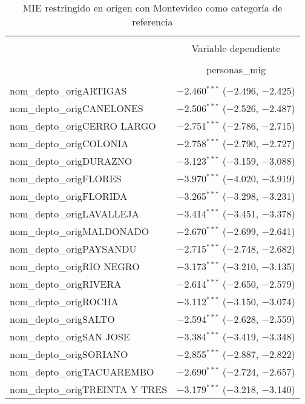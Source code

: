
\begin{table}[H] \centering 
  \caption{MIE restringido en origen con Montevideo como categoría de referencia} 
  \label{} 
\begin{tabular}{@{\extracolsep{5pt}}lc} 
\\[-1.8ex]\hline 
\hline \\[-1.8ex] 
 & \multicolumn{1}{c}{Variable dependiente} \\ 
\cline{2-2} 
\\[-1.8ex] & personas\_mig \\ 
\hline \\[-1.8ex] 
 nom\_depto\_origARTIGAS & $-$2.460$^{***}$ ($-$2.496, $-$2.425) \\ 
  nom\_depto\_origCANELONES & $-$2.506$^{***}$ ($-$2.526, $-$2.487) \\ 
  nom\_depto\_origCERRO LARGO & $-$2.751$^{***}$ ($-$2.786, $-$2.715) \\ 
  nom\_depto\_origCOLONIA & $-$2.758$^{***}$ ($-$2.790, $-$2.727) \\ 
  nom\_depto\_origDURAZNO & $-$3.123$^{***}$ ($-$3.159, $-$3.088) \\ 
  nom\_depto\_origFLORES & $-$3.970$^{***}$ ($-$4.020, $-$3.919) \\ 
  nom\_depto\_origFLORIDA & $-$3.265$^{***}$ ($-$3.298, $-$3.231) \\ 
  nom\_depto\_origLAVALLEJA & $-$3.414$^{***}$ ($-$3.451, $-$3.378) \\ 
  nom\_depto\_origMALDONADO & $-$2.670$^{***}$ ($-$2.699, $-$2.641) \\ 
  nom\_depto\_origPAYSANDU & $-$2.715$^{***}$ ($-$2.748, $-$2.682) \\ 
  nom\_depto\_origRIO NEGRO & $-$3.173$^{***}$ ($-$3.210, $-$3.135) \\ 
  nom\_depto\_origRIVERA & $-$2.614$^{***}$ ($-$2.650, $-$2.579) \\ 
  nom\_depto\_origROCHA & $-$3.112$^{***}$ ($-$3.150, $-$3.074) \\ 
  nom\_depto\_origSALTO & $-$2.594$^{***}$ ($-$2.628, $-$2.559) \\ 
  nom\_depto\_origSAN JOSE & $-$3.384$^{***}$ ($-$3.419, $-$3.348) \\ 
  nom\_depto\_origSORIANO & $-$2.855$^{***}$ ($-$2.887, $-$2.822) \\ 
  nom\_depto\_origTACUAREMBO & $-$2.690$^{***}$ ($-$2.724, $-$2.657) \\ 
  nom\_depto\_origTREINTA Y TRES & $-$3.179$^{***}$ ($-$3.218, $-$3.140) \\ 

\end{tabular}
\end{table}
